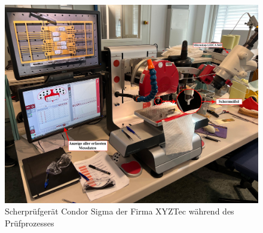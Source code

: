 \begin{figure}[H]
    \centering
    \includegraphics[scale=0.2]{Bilder/WhatsApp Image 2025-03-28 at 17.45.42.jpeg}
    \caption{Scherprüfgerät Condor Sigma der Firma XYZTec während des Prüfprozesses}
    \label{CondorSigma}
\end{figure}
